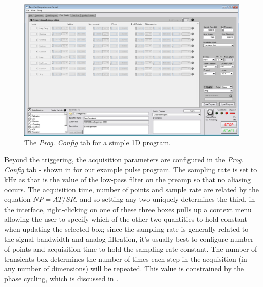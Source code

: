 \documentclass[PaulGanssle-Thesis.tex]{subfiles}
\begin{document}
\begin{figure}[!h]
\includegraphics[width=\textwidth]{figures/console/program_config_1d.png}
\caption{The \textit{Prog. Config} tab for a simple 1D program.}
\label{fig:ProgConfigTab1d}
\end{figure}

Beyond the triggering, the acquisition parameters are configured in the \textit{Prog. Config} tab - shown in  for our example pulse program. The sampling rate is set to \unit[1]{kHz} as that is the value of the low-pass filter on the preamp so that no aliasing occurs. The acquisition time, number of points and sample rate are related by the equation $NP = AT/SR$, and so setting any two uniquely determines the third, in the interface, right-clicking on one of these three boxes pulls up a context menu allowing the user to specify which of the other two quantities to hold constant when updating the selected box; since the sampling rate is generally related to the signal bandwidth and analog filtration, it's usually best to configure number of points and acquisition time to hold the sampling rate constant. The number of transients box determines the number of times each step in the acquisition (in any number of dimensions) will be repeated. This value is constrained by the phase cycling, which is discussed in .
\end{document}
